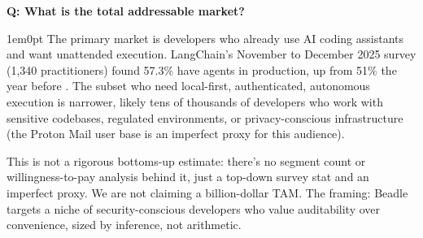 \documentclass[11pt,letterpaper]{article}
\newcounter{faqnum}
\newenvironment{faqpair}[1]{%
  \needspace{4\baselineskip}%
  \vspace{0.5em}%
  \refstepcounter{faqnum}%
  \noindent\textbf{\color{SectionBlue}Q\thefaqnum: #1}\par\nopagebreak[4]%
  \vspace{0.2em}%
  \begin{adjustwidth}{1em}{0pt}%
  \setlength{\parindent}{0pt}%
}{%
  \end{adjustwidth}%
  \vspace{0.5em}%
}
\begin{document}
\begin{faqpair}{What is the total addressable market?}\label{faq:tam}
  The primary market is developers who already use AI coding assistants and want
  unattended execution. LangChain's November to December 2025 survey (1,340
  practitioners) found 57.3\% have agents in production, up from 51\% the
  year before \cite{langchain2025agenteng, langchain2024agents}.
  The subset who need local-first, authenticated, autonomous execution is
  narrower, likely tens of thousands of developers who work with sensitive
  codebases, regulated environments, or privacy-conscious infrastructure
  (the Proton Mail user base is an imperfect proxy for this audience).

  This is not a rigorous bottoms-up estimate: there's no segment count
  or willingness-to-pay analysis behind it, just a top-down survey stat and
  an imperfect proxy. We are not claiming a billion-dollar TAM. The
  framing: Beadle targets a niche of security-conscious developers who
  value auditability over convenience, sized by inference, not
  arithmetic.
\end{faqpair}
\end{document}
